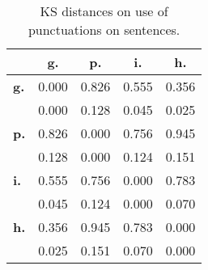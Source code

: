 \begin{table}[h!]
\begin{center}
\begin{tabular}{| l || c | c | c | c |}\hline
 & {\bf g.} & {\bf p.} & {\bf i.} & {\bf h.} \\\hline\hline
{\bf g.} & 0.000 & 0.826 & 0.555 & 0.356 \\
{\bf } & 0.000 & 0.128 & 0.045 & 0.025 \\\hline
{\bf p.} & 0.826 & 0.000 & 0.756 & 0.945 \\
{\bf } & 0.128 & 0.000 & 0.124 & 0.151 \\\hline
{\bf i.} & 0.555 & 0.756 & 0.000 & 0.783 \\
{\bf } & 0.045 & 0.124 & 0.000 & 0.070 \\\hline
{\bf h.} & 0.356 & 0.945 & 0.783 & 0.000 \\
{\bf } & 0.025 & 0.151 & 0.070 & 0.000 \\\hline
\end{tabular}
\caption{KS distances on use of punctuations on sentences.}
\end{center}
\end{table}